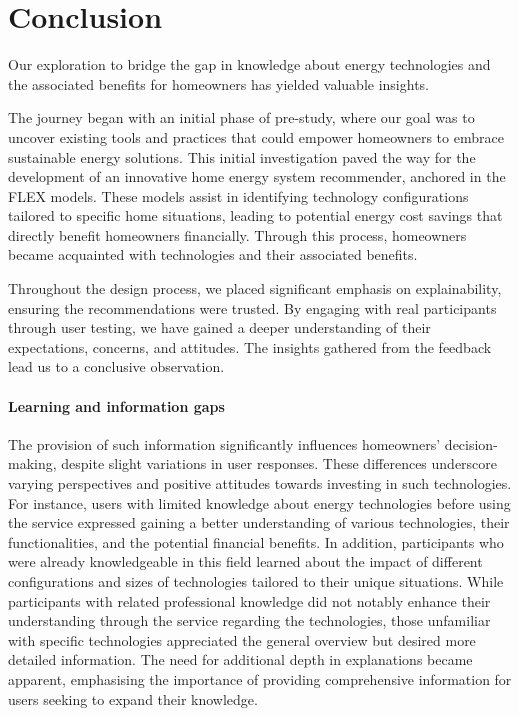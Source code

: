 \chapter{Conclusion}

Our exploration to bridge the gap in knowledge about energy technologies and the associated benefits for homeowners has yielded valuable insights. 

The journey began with an initial phase of pre-study, where our goal was to uncover existing tools and practices that could empower homeowners to embrace sustainable energy solutions. 
This initial investigation paved the way for the development of an innovative home energy system recommender, anchored in the FLEX models. 
These models assist in identifying technology configurations tailored to specific home situations, leading to potential energy cost savings that directly benefit homeowners financially. 
Through this process, homeowners became acquainted with technologies and their associated benefits. 

Throughout the design process, we placed significant emphasis on explainability, ensuring the recommendations were trusted.  
By engaging with real participants through user testing, we have gained a deeper understanding of their expectations, concerns, and attitudes. 
The insights gathered from the feedback lead us to a conclusive observation.


\subsubsection*{Learning and information gaps}

The provision of such information significantly influences homeowners' decision-making, despite slight variations in user responses. 
These differences underscore varying perspectives and positive attitudes towards investing in such technologies. 
For instance, users with limited knowledge about energy technologies before using the service expressed gaining a better understanding of various technologies, their functionalities, and the potential financial benefits.
In addition, participants who were already knowledgeable in this field learned about the impact of different configurations and sizes of technologies tailored to their unique situations. 
While participants with related professional knowledge did not notably enhance their understanding through the service regarding the technologies, those unfamiliar with specific technologies appreciated the general overview but desired more detailed information. 
The need for additional depth in explanations became apparent, emphasising the importance of providing comprehensive information for users seeking to expand their knowledge. 

